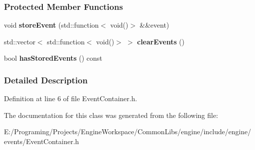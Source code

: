 \subsubsection*{Protected Member Functions}
\begin{DoxyCompactItemize}
\item 
void {\bfseries store\+Event} (std\+::function$<$ void()$>$ \&\&event)\hypertarget{a00032_a58488602891a7963895ba6f5b50b49ef}{}\label{a00032_a58488602891a7963895ba6f5b50b49ef}

\item 
std\+::vector$<$ std\+::function$<$ void()$>$ $>$ {\bfseries clear\+Events} ()\hypertarget{a00032_ac2d38cbe364ea23cb5919d76ad995407}{}\label{a00032_ac2d38cbe364ea23cb5919d76ad995407}

\item 
bool {\bfseries has\+Stored\+Events} () const \hypertarget{a00032_ad8c3610cafce6f79319b7dd4787b47d6}{}\label{a00032_ad8c3610cafce6f79319b7dd4787b47d6}

\end{DoxyCompactItemize}


\subsubsection{Detailed Description}


Definition at line 6 of file Event\+Container.\+h.



The documentation for this class was generated from the following file\+:\begin{DoxyCompactItemize}
\item 
E\+:/\+Programing/\+Projects/\+Engine\+Workspace/\+Common\+Libs/engine/include/engine/events/Event\+Container.\+h\end{DoxyCompactItemize}
